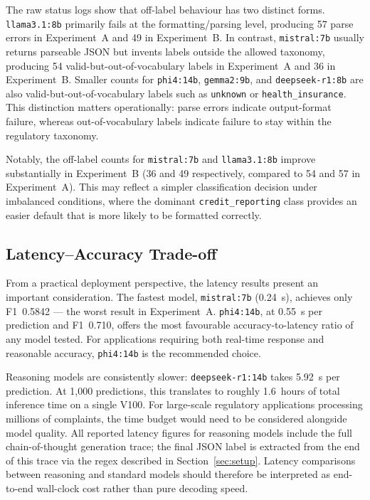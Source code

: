 \documentclass[journal]{IEEEtran}
\begin{document}
The raw status logs show that off-label behaviour has two distinct
forms. \texttt{llama3.1:8b} primarily fails at the formatting/parsing
level, producing 57 parse errors in Experiment~A and 49 in
Experiment~B. In contrast, \texttt{mistral:7b} usually returns
parseable JSON but invents labels outside the allowed taxonomy,
producing 54 valid-but-out-of-vocabulary labels in Experiment~A and
36 in Experiment~B. Smaller counts for \texttt{phi4:14b},
\texttt{gemma2:9b}, and \texttt{deepseek-r1:8b} are also
valid-but-out-of-vocabulary labels such as \texttt{unknown} or
\texttt{health\_insurance}. This distinction matters operationally:
parse errors indicate output-format failure, whereas out-of-vocabulary
labels indicate failure to stay within the regulatory taxonomy.

Notably, the off-label counts for \texttt{mistral:7b} and
\texttt{llama3.1:8b} improve substantially in Experiment~B
(36 and 49 respectively, compared to 54 and 57 in Experiment~A).
This may reflect a simpler classification decision under
imbalanced conditions, where the dominant \texttt{credit\_reporting}
class provides an easier default that is more likely to be
formatted correctly.

\subsection{Latency–Accuracy Trade-off}

From a practical deployment perspective, the latency results present
an important consideration. The fastest model, \texttt{mistral:7b}
(0.24~s), achieves only F1~0.5842 — the worst result in Experiment~A.
\texttt{phi4:14b}, at 0.55~s per prediction and F1~0.710, offers
the most favourable accuracy-to-latency ratio of any model tested.
For applications requiring both real-time response and reasonable
accuracy, \texttt{phi4:14b} is the recommended choice.

Reasoning models are consistently slower: \texttt{deepseek-r1:14b}
takes 5.92~s per prediction. At 1,000 predictions, this translates
to roughly 1.6~hours of total inference time on a single V100. For
large-scale regulatory applications processing millions of complaints,
the time budget would need to be considered alongside model quality.
All reported latency figures for reasoning models include the full
chain-of-thought generation trace; the final JSON label is extracted
from the end of this trace via the regex described in
Section~\ref{sec:setup}. Latency comparisons between reasoning and
standard models should therefore be interpreted as end-to-end
wall-clock cost rather than pure decoding speed.
\end{document}
